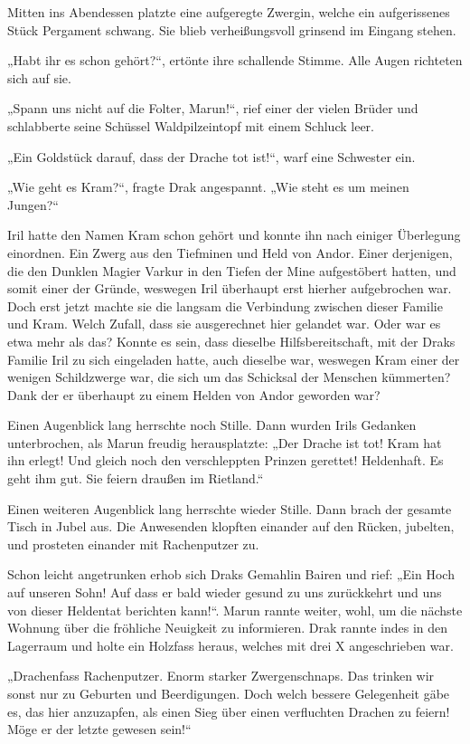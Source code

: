 Mitten ins Abendessen platzte eine aufgeregte Zwergin, welche ein aufgerissenes Stück Pergament schwang. Sie blieb verheißungsvoll grinsend im Eingang stehen.

„Habt ihr es schon gehört?“, ertönte ihre schallende Stimme. Alle Augen richteten sich auf sie.

„Spann uns nicht auf die Folter, Marun!“, rief einer der vielen Brüder und schlabberte seine Schüssel Waldpilzeintopf mit einem Schluck leer.

„Ein Goldstück darauf, dass der Drache tot ist!“, warf eine Schwester ein.

„Wie geht es Kram?“, fragte Drak angespannt. „Wie steht es um meinen Jungen?“

Iril hatte den Namen Kram schon gehört und konnte ihn nach einiger Überlegung einordnen. Ein Zwerg aus den Tiefminen und Held von Andor. Einer derjenigen, die den Dunklen Magier Varkur in den Tiefen der Mine aufgestöbert hatten, und somit einer der Gründe, weswegen Iril überhaupt erst hierher aufgebrochen war. Doch erst jetzt machte sie die langsam die Verbindung zwischen dieser Familie und Kram. Welch Zufall, dass sie ausgerechnet hier gelandet war. Oder war es etwa mehr als das? Konnte es sein, dass dieselbe Hilfsbereitschaft, mit der Draks Familie Iril zu sich eingeladen hatte, auch dieselbe war, weswegen Kram einer der wenigen Schildzwerge war, die sich um das Schicksal der Menschen kümmerten? Dank der er überhaupt zu einem Helden von Andor geworden war?

Einen Augenblick lang herrschte noch Stille. Dann wurden Irils Gedanken unterbrochen, als Marun freudig herausplatzte: „Der Drache ist tot! Kram hat ihn erlegt! Und gleich noch den verschleppten Prinzen gerettet! Heldenhaft. Es geht ihm gut. Sie feiern draußen im Rietland.“

Einen weiteren Augenblick lang herrschte wieder Stille. Dann brach der gesamte Tisch in Jubel aus. Die Anwesenden klopften einander auf den Rücken, jubelten, und prosteten einander mit Rachenputzer zu.

Schon leicht angetrunken erhob sich Draks Gemahlin Bairen und rief: „Ein Hoch auf unseren Sohn! Auf dass er bald wieder gesund zu uns zurückkehrt und uns von dieser Heldentat berichten kann!“. Marun rannte weiter, wohl, um die nächste Wohnung über die fröhliche Neuigkeit zu informieren. Drak rannte indes in den Lagerraum und holte ein Holzfass heraus, welches mit drei X angeschrieben war.

„Drachenfass Rachenputzer. Enorm starker Zwergenschnaps. Das trinken wir sonst nur zu Geburten und Beerdigungen. Doch welch bessere Gelegenheit gäbe es, das hier anzuzapfen, als einen Sieg über einen verfluchten Drachen zu feiern! Möge er der letzte gewesen sein!“

